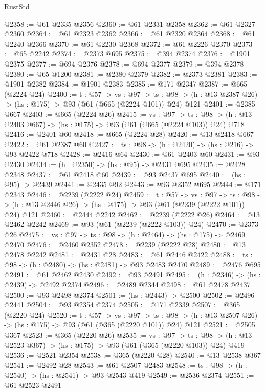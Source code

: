 \begin{lexlean}{RustStd}
\begin{coremodule}
@2358 := @61 @2335 @2356
@2360 := @61 @2331 @2358
@2362 := @61 @2327 @2360
@2364 := @61 @2323 @2362
@2366 := @61 @2320 @2364
@2368 := @61 @2240 @2366
@2370 := @61 @2230 @2368
@2372 := @61 @2226 @2370
@2373 := @65 @2242
@2374 := @2373 @695
@2375 := @394 @2374
@2376 := @1901 @2375
@2377 := @694 @2376
@2378 := @694 @2377
@2379 := @394 @2378
@2380 := @65 @1200
@2381 := @2380 @2379
@2382 := @2373 @2381
@2383 := @1901 @2382
@2384 := @1901 @2383
@2385 := @171 @2347
@2387 := @665 (@2224 @24)
@2400 := {t : @57} ->
  {vs : @97} ->
  {ts : @98} -> (h : @13 @2387 @26) -> (hs : @175) -> @93 (@61 (@665 (@2224 @101)) @24) @121
@2401 := @2385 @667
@2403 := @665 (@2224 @26)
@2415 := {vs : @97} ->
  {ts : @98} -> (h : @13 @2403 @667) -> (hs : @175) -> @93 (@61 (@665 (@2224 @103)) @24) @718
@2416 := @2401 @60
@2418 := @665 (@2224 @28)
@2420 := @13 @2418 @667
@2422 := @61 @2387 @60
@2427 := {ts : @98} -> (h : @2420) -> (hs : @216) -> @93 @2422 @718
@2428 := @2416 @64
@2430 := @61 @2403 @60
@2431 := @93 @2430
@2434 := (h : @2350) -> (hs : @95) -> @2431 @695
@2435 := @2428 @2348
@2437 := @61 @2418 @60
@2439 := @93 @2437 @695
@2440 := (hs : @95) -> @2439
@2441 := @2435 @92
@2443 := @93 @2352 @695
@2444 := @171 @2343
@2446 := @2239 (@2222 @24)
@2459 := {t : @57} ->
  {vs : @97} ->
  {ts : @98} -> (h : @13 @2446 @26) -> (hs : @175) -> @93 (@61 (@2239 (@2222 @101)) @24) @121
@2460 := @2444 @2242
@2462 := @2239 (@2222 @26)
@2464 := @13 @2462 @2242
@2469 := @93 (@61 (@2239 (@2222 @103)) @24)
@2470 := @2373 @26
@2475 := {vs : @97} -> {ts : @98} -> (h : @2464) -> (hs : @175) -> @2469 @2470
@2476 := @2460 @2352
@2478 := @2239 (@2222 @28)
@2480 := @13 @2478 @2242
@2481 := @2431 @28
@2483 := @61 @2446 @2422
@2488 := {ts : @98} -> (h : @2480) -> (hs : @2481) -> @93 @2483 @2470
@2489 := @2476 @695
@2491 := @61 @2462 @2430
@2492 := @93 @2491
@2495 := (h : @2346) -> (hs : @2439) -> @2492 @2374
@2496 := @2489 @2344
@2498 := @61 @2478 @2437
@2500 := @93 @2498 @2374
@2501 := (hs : @2443) -> @2500
@2502 := @2496 @2441
@2504 := @93 @2354 @2374
@2505 := @171 @2339
@2507 := @365 (@2220 @24)
@2520 := {t : @57} ->
  {vs : @97} ->
  {ts : @98} -> (h : @13 @2507 @26) -> (hs : @175) -> @93 (@61 (@365 (@2220 @101)) @24) @121
@2521 := @2505 @367
@2523 := @365 (@2220 @26)
@2535 := {vs : @97} ->
  {ts : @98} -> (h : @13 @2523 @367) -> (hs : @175) -> @93 (@61 (@365 (@2220 @103)) @24) @419
@2536 := @2521 @2354
@2538 := @365 (@2220 @28)
@2540 := @13 @2538 @367
@2541 := @2492 @28
@2543 := @61 @2507 @2483
@2548 := {ts : @98} -> (h : @2540) -> (hs : @2541) -> @93 @2543 @419
@2549 := @2536 @2374
@2551 := @61 @2523 @2491

\end{coremodule}
\end{lexlean}
